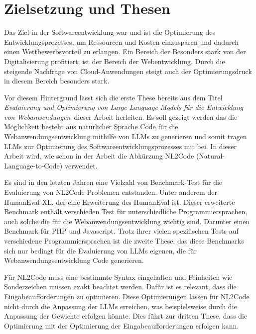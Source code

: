 

\section{Zielsetzung und Thesen}
\label{sec:goals_of_the_work}
Das Ziel in der Softwareentwicklung war und ist die Optimierung des Entwicklungsprozesses, um Ressourcen und Kosten einzusparen und dadurch einen Wettbewerbsvorteil zu erlangen. Ein Bereich der Besonders stark von der Digitalisierung profitiert, ist der Bereich der Webentwicklung. Durch die steigende Nachfrage von Cloud-Anwendungen steigt auch der Optimierungsdruck in diesem Bereich besonders stark.\vspace{0.2cm}

Vor diesem Hintergrund lässt sich die erste These bereits aus dem Titel \glqq \textit{Evaluierung und Optimierung von Large Language Models für die Entwicklung von Webanwendungen}\grqq \ dieser Arbeit herleiten. Es soll gezeigt werden das die Möglichkeit besteht aus natürlicher Sprache Code für die Webanwendungsentwicklung mithilfe von LLMs zu generieren und somit tragen LLMs zur Optimierung des Softwareentwicklungsprozesses mit bei. In dieser Arbeit wird, wie schon in der Arbeit \cite[vgl. Seite 2]{jiang-2024} die Abkürzung NL2Code (Natural-Language-to-Code) verwendet.\vspace{0.2cm}

Es sind in den letzten Jahren eine Vielzahl von Benchmark-Test für die Evaluierung von NL2Code Problemen entstanden. Unter anderem der HumanEval-XL, der eine Erweiterung des HumanEval ist. Dieser erweiterte Benchmark enthält verschieden Test für unterschiedliche Programmiersprachen, auch solche die für die Webanwendungsentwicklung wichtig sind. Darunter einen Benchmark für PHP und Javascript. Trotz ihrer vielen spezifischen Tests auf verschiedene Programmiersprachen ist die zweite These, das diese Benchmarks sich nur bedingt für die Evaluierung von LLMs eigenen, die für Webanwendungsentwicklung Code generieren.\vspace{0.2cm}

Für NL2Code muss eine bestimmte Syntax eingehalten und Feinheiten wie Sonderzeichen müssen exakt beachtet werden. Dafür ist es relevant, dass die Eingabeaufforderungen zu optimieren. Diese Optimierungen lassen für NL2Code nicht durch die Anpassung der LLMs erreichen, was beispielsweise durch die Anpassung der Gewichte erfolgen könnte. Dies führt zur dritten These, dass die Optimierung mit der Optimierung der Eingabeaufforderungen erfolgen kann.\vspace{0.2cm}

